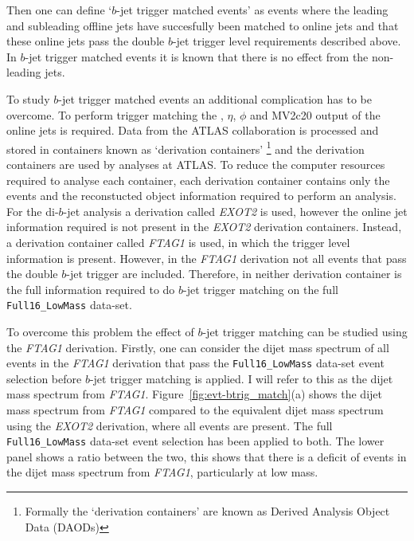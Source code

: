 Then one can define `$b$-jet trigger matched events' as events where
the leading and subleading offline jets have succesfully been matched to online jets
and that these online jets pass the double $b$-jet trigger level requirements described above.
In $b$-jet trigger matched events it is known that there is no effect from the non-leading jets.

To study $b$-jet trigger matched events an additional complication has to be overcome.
To perform trigger matching the \pT, $\eta$, $\phi$ and MV2c20 output of the online jets is required.
Data from the ATLAS collaboration is processed and stored in containers known as `derivation containers'
\footnote{Formally the `derivation containers' are known as Derived Analysis Object Data (DAODs)}
and the derivation containers are used by analyses at ATLAS.
To reduce the computer resources required to analyse each container, each derivation container contains only the events
and the reconstucted object information required to perform an analysis.
For the di-$b$-jet analysis a derivation called \textit{EXOT2} is used,
however the online jet information required is not present in the \textit{EXOT2} derivation containers.
Instead, a derivation container called \textit{FTAG1} is used, in which the trigger level information is present.
However, in the \textit{FTAG1} derivation not all events that pass the double $b$-jet trigger are included.
Therefore, in neither derivation container is the full information required to do $b$-jet trigger matching on the full \verb|Full16_LowMass| data-set.

To overcome this problem the effect of $b$-jet trigger matching can be studied using the \textit{FTAG1} derivation.
Firstly, one can consider the dijet mass spectrum of all events in the \textit{FTAG1} derivation
that pass the \verb|Full16_LowMass| data-set event selection before $b$-jet trigger matching is applied.
I will refer to this as the dijet mass spectrum from \textit{FTAG1}.
Figure~\ref{fig:evt-btrig_match}(a) shows the dijet mass spectrum from \textit{FTAG1}
compared to the equivalent dijet mass spectrum using the \textit{EXOT2} derivation, where all events are present.
The full \verb|Full16_LowMass| data-set event selection has been applied to both.
The lower panel shows a ratio between the two, this shows that there is a deficit of events
in the dijet mass spectrum from \textit{FTAG1}, particularly at low mass.

